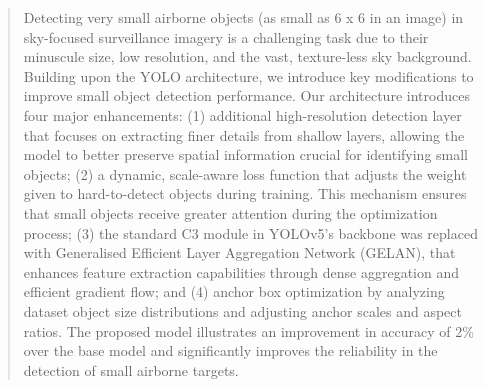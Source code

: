 \documentclass[preprint,review,12pt]{elsarticle}
\begin{document}
\begin{frontmatter}

    

\author[11]{Aditi Bhosale, Shubham Phapale, Zaid Ali, Gajanan Sapsod, \\ Gaurav Mishra , Manish Kurhekar and Anshul Agarwal} %


\begin{abstract}
Detecting very small airborne objects (as small as 6 x 6 in an image) in sky-focused surveillance imagery is a challenging task due to their minuscule size, low resolution, and the vast, texture-less sky background. Building upon the YOLO architecture, we introduce key modifications to improve small object detection performance. 
Our architecture introduces four major enhancements: (1) additional high-resolution detection layer that focuses on extracting finer details from shallow layers, allowing the model to better preserve spatial information crucial for identifying small objects; (2) a dynamic, scale-aware loss function that adjusts the weight given to hard-to-detect objects during training.  This mechanism ensures that small objects receive greater attention during the optimization process; (3) the standard C3 module in YOLOv5’s backbone was replaced with Generalised Efficient Layer Aggregation Network (GELAN), that enhances feature extraction capabilities through dense aggregation and efficient gradient flow; and (4) anchor box optimization by analyzing dataset object size distributions and adjusting anchor scales and aspect ratios. The proposed model illustrates an improvement in accuracy of 2\% over the base model and significantly improves the reliability in the detection of small airborne targets. 
\end{abstract}


\end{frontmatter}
\end{document}
